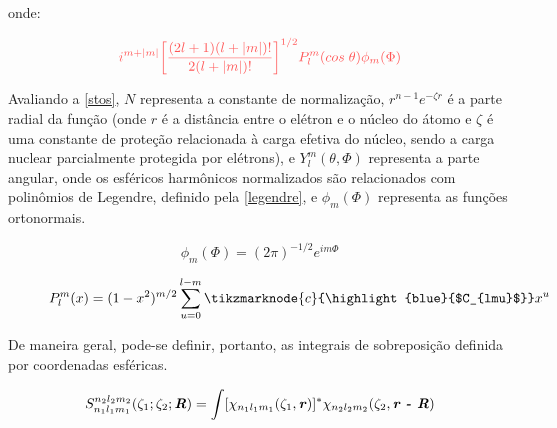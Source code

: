 \noindent onde:

\begin{equation}
    \textcolor{red!67}{i^{m + |m|}\bigg{[}\displaystyle \frac{(2l+1)(l+|m|)!}{2(l + |m|)!}\bigg{]}^{1/2} P^m_l (cos \; \theta) \phi_m(\Phi)}
\end{equation}

Avaliando a \autoref{stos}, $N$ representa a constante de normalização, $r^{n-1}e^{-\zeta r}$ é a parte radial da função (onde $r$ é a distância entre o elétron e o núcleo do átomo e $\zeta$ é uma constante de proteção relacionada à carga efetiva do núcleo, sendo a carga nuclear parcialmente protegida por elétrons), e $Y_l^m (\theta, \Phi)$ representa a parte angular, onde os esféricos harmônicos normalizados são relacionados com polinômios de Legendre, definido pela \autoref{legendre}, e $\phi_m (\Phi)$ representa as funções ortonormais.

\begin{figure}[htb]
\begin{equation}
    \phi_m (\Phi) = (2\pi)^{-1/2} e^{im\Phi}
\end{equation}
\end{figure}

\begin{figure}[htb]
    \vspace{3\baselineskip}
\begin{equation}
\label{legendre}
    P^m_l(x) = (1 - x^2)^{m/2} \sum_{u=0}^{l - m} \tikzmarknode{c}{\highlight{blue}{$C_{lmu}$}} x^u
\end{equation}
\end{figure}

De maneira geral, pode-se definir, portanto, as integrais de sobreposição \autocite{Hoggan2011}
definida por coordenadas esféricas.

\begin{equation}
\label{overlap}
    S^{n_2 l_2 m_2}_{n_1 l_1 m_1} (\zeta_1; \zeta_2; \textbf{\textit{R}} ) = \int [\chi_{n_1 l_1 m_1} (\zeta_1, \textbf{\textit{r}})]^* \chi_{n_2 l_2 m_2} (\zeta_2, \textbf{\textit{r - R}})
\end{equation}

